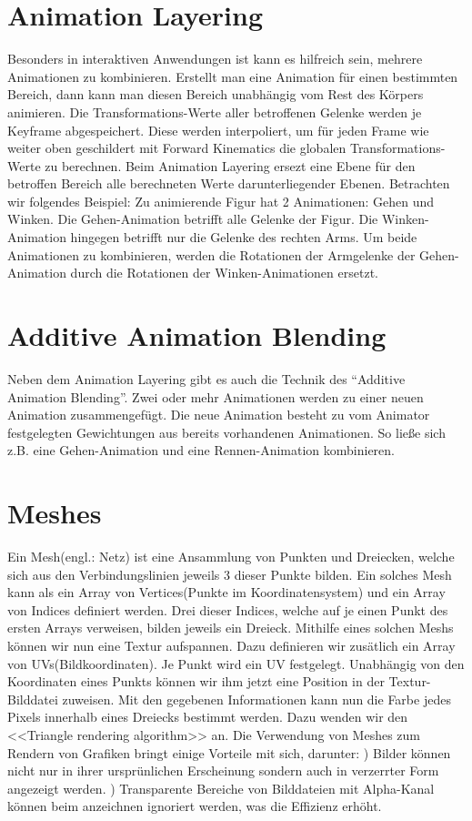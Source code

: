 \section{Animation Layering}
%
Besonders in interaktiven Anwendungen ist kann es hilfreich sein, mehrere Animationen zu kombinieren. Erstellt man eine Animation für einen bestimmten Bereich, dann kann man diesen Bereich unabhängig vom Rest des Körpers animieren. Die Transformations-Werte aller betroffenen Gelenke werden je Keyframe abgespeichert. Diese werden interpoliert, um für jeden Frame wie weiter oben geschildert mit Forward Kinematics die globalen Transformations-Werte zu berechnen. Beim Animation Layering ersezt eine Ebene für den betroffen Bereich alle berechneten Werte darunterliegender Ebenen.
\newline\newline
Betrachten wir folgendes Beispiel: \newline
Zu animierende Figur hat 2 Animationen: Gehen und Winken. Die Gehen-Animation betrifft alle Gelenke der Figur. Die Winken-Animation hingegen betrifft nur die Gelenke des rechten Arms. Um beide Animationen zu kombinieren, werden die Rotationen der Armgelenke der Gehen-Animation durch die Rotationen der Winken-Animationen ersetzt.
%
\section{Additive Animation Blending}
%
Neben dem Animation Layering gibt es auch die Technik des ``Additive Animation Blending''. Zwei oder mehr Animationen werden zu einer neuen Animation zusammengefügt. Die neue Animation besteht zu vom Animator festgelegten Gewichtungen aus bereits vorhandenen Animationen. So ließe sich z.B. eine Gehen-Animation und eine Rennen-Animation kombinieren. 
%
\section{Meshes}
%
Ein Mesh(engl.: Netz) ist eine Ansammlung von Punkten und Dreiecken, welche sich aus den Verbindungslinien jeweils 3 dieser Punkte bilden. Ein solches Mesh kann als ein Array von Vertices(Punkte im Koordinatensystem) und ein Array von Indices definiert werden. Drei dieser Indices, welche auf je einen Punkt des ersten Arrays verweisen, bilden jeweils ein Dreieck. Mithilfe eines solchen Meshs können wir nun eine Textur aufspannen. Dazu definieren wir zusätlich ein Array von UVs(Bildkoordinaten). Je Punkt wird ein UV festgelegt. Unabhängig von den Koordinaten eines Punkts können wir ihm jetzt eine Position in der Textur-Bilddatei zuweisen. Mit den gegebenen Informationen kann nun die Farbe jedes Pixels innerhalb eines Dreiecks bestimmt werden. Dazu wenden wir den <<Triangle rendering algorithm>> an.
\newline\newline
Die Verwendung von Meshes zum Rendern von Grafiken bringt einige Vorteile mit sich, darunter: 
) Bilder können nicht nur in ihrer ursprünlichen Erscheinung sondern auch in verzerrter Form angezeigt werden.
) Transparente Bereiche von Bilddateien mit Alpha-Kanal können beim anzeichnen ignoriert werden, was die Effizienz erhöht.
%
